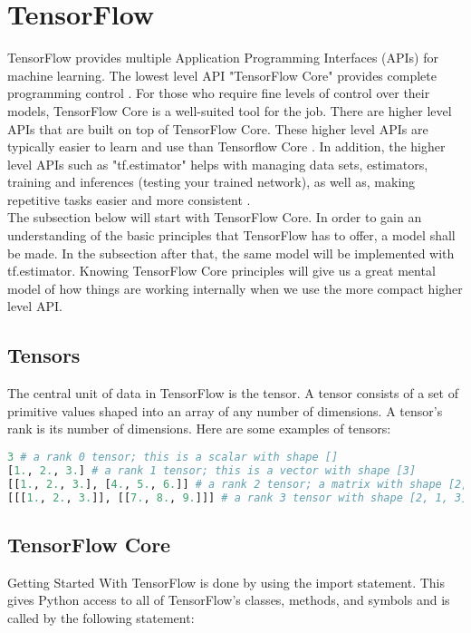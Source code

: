 \section{TensorFlow}

TensorFlow provides multiple Application Programming Interfaces
(APIs) for machine learning. 
The lowest level API "TensorFlow Core" provides complete programming control \cite{tensorflow2015-whitepaper}. 
For those who require fine levels of control over their models,
TensorFlow Core is a well-suited tool for the job. There are higher level APIs that are built on top of TensorFlow Core.
These higher level APIs are typically easier to learn and use than Tensorflow Core \cite{tensorflow2015-whitepaper}.
In addition, the higher level APIs such as "tf.estimator" helps with managing data sets, estimators,
training and inferences (testing your trained network),
as well as, making repetitive tasks easier and more consistent
\cite{tensorflow2015-whitepaper}.\\

The subsection below will start with TensorFlow Core. 
In order to gain an understanding of the basic principles that TensorFlow has to offer, a model shall be made. 
In the subsection after that, the same model will be implemented with tf.estimator. 
Knowing TensorFlow Core principles will give us a great mental model of how things are working internally when we use the more compact higher level API.

\subsection{Tensors}
The central unit of data in TensorFlow is the tensor. 
A tensor consists of a set of primitive values shaped into an array of any number of dimensions. 
A tensor's rank is its number of dimensions. 
Here are some examples of tensors:

\begin{lstlisting}[language=Python, caption=Tensor examples.]
3 # a rank 0 tensor; this is a scalar with shape []
[1., 2., 3.] # a rank 1 tensor; this is a vector with shape [3]
[[1., 2., 3.], [4., 5., 6.]] # a rank 2 tensor; a matrix with shape [2, 3]
[[[1., 2., 3.]], [[7., 8., 9.]]] # a rank 3 tensor with shape [2, 1, 3]
\end{lstlisting} 

\subsection{TensorFlow Core}
Getting Started With TensorFlow is done by using the import statement. 
This gives Python access to all of TensorFlow's classes,
methods, and symbols and is called by the following statement:

